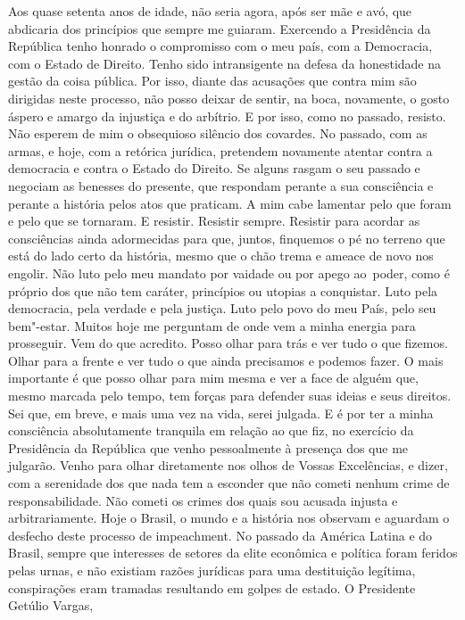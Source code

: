 Aos quase setenta anos de idade, não seria agora, após ser mãe e avó,
que abdicaria dos princípios que sempre me guiaram. Exercendo a
Presidência da República tenho honrado o compromisso com o meu país, com
a Democracia, com o Estado de Direito. Tenho sido intransigente na
defesa da honestidade na gestão da coisa pública. Por isso, diante das
acusações que contra mim são dirigidas neste processo, não posso deixar
de sentir, na boca, novamente, o gosto áspero e amargo da injustiça e do
arbítrio. E por isso, como no passado, resisto. Não esperem de mim o
obsequioso silêncio dos covardes. No passado, com as armas, e hoje, com
a retórica jurídica, pretendem novamente atentar contra a democracia e
contra o Estado do Direito. Se alguns rasgam o seu passado e negociam as
benesses do presente, que respondam perante a sua consciência e perante
a história pelos atos que praticam. A mim cabe lamentar pelo que foram e
pelo que se tornaram. E resistir. Resistir sempre. Resistir para acordar
as consciências ainda adormecidas para que, juntos, finquemos o pé no
terreno que está do lado certo da história, mesmo que o chão trema e
ameace de novo nos engolir. Não luto pelo meu mandato por vaidade ou por
apego ao~poder, como é próprio dos que não tem caráter, princípios ou
utopias a conquistar. Luto pela democracia, pela verdade e pela justiça.
Luto pelo povo do meu País, pelo seu bem"-estar. Muitos hoje me perguntam
de onde vem a minha energia para prosseguir. Vem do que acredito. Posso
olhar para trás e ver tudo o que fizemos. Olhar para a frente e ver tudo
o que ainda precisamos e podemos fazer. O mais importante é que posso
olhar para mim mesma e ver a face de alguém que, mesmo marcada pelo
tempo, tem forças para defender suas ideias e seus direitos. Sei que, em
breve, e mais uma vez na vida, serei julgada. E é por ter a minha
consciência absolutamente tranquila em relação ao que fiz, no exercício
da Presidência da República que venho pessoalmente à presença dos que me
julgarão. Venho para olhar diretamente nos olhos de Vossas Excelências,
e dizer, com a serenidade dos que nada tem a esconder que não cometi
nenhum crime de responsabilidade. Não cometi os crimes dos quais sou
acusada injusta e arbitrariamente. Hoje o Brasil, o mundo e a história
nos observam e aguardam o desfecho deste processo de impeachment. No
passado da América Latina e do Brasil, sempre que interesses de setores
da elite econômica e política foram feridos pelas urnas, e não existiam
razões jurídicas para uma destituição legítima, conspirações eram
tramadas resultando em golpes de estado. O Presidente Getúlio Vargas,
